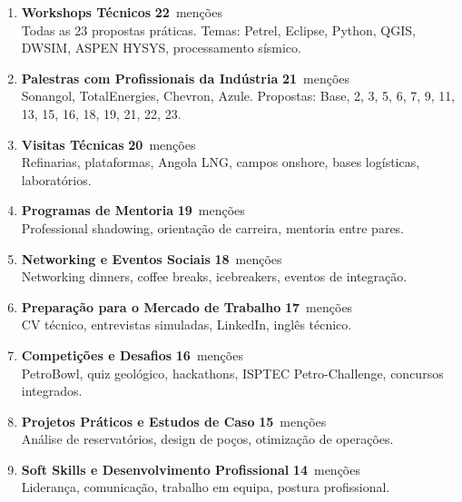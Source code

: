 \documentclass[12pt,a4paper]{article}
\newcommand{\freqstat}[2]{%
  {\large\bfseries\color{steelblue}#1}~{\small\color{muted}#2}%
}
\begin{document}
\begin{enumerate}[label={\color{steelblue}\bfseries\arabic*.}, itemsep=0.28cm]

\item \textbf{Workshops Técnicos} \hfill \freqstat{22}{menções}\\
{\small\color{muted}Todas as 23 propostas práticas. Temas: Petrel, Eclipse, Python, QGIS, DWSIM, ASPEN HYSYS, processamento sísmico.}

\item \textbf{Palestras com Profissionais da Indústria} \hfill \freqstat{21}{menções}\\
{\small\color{muted}Sonangol, TotalEnergies, Chevron, Azule. Propostas: Base, 2, 3, 5, 6, 7, 9, 11, 13, 15, 16, 18, 19, 21, 22, 23.}

\item \textbf{Visitas Técnicas} \hfill \freqstat{20}{menções}\\
{\small\color{muted}Refinarias, plataformas, Angola LNG, campos onshore, bases logísticas, laboratórios.}

\item \textbf{Programas de Mentoria} \hfill \freqstat{19}{menções}\\
{\small\color{muted}Professional shadowing, orientação de carreira, mentoria entre pares.}

\item \textbf{Networking e Eventos Sociais} \hfill \freqstat{18}{menções}\\
{\small\color{muted}Networking dinners, coffee breaks, icebreakers, eventos de integração.}

\item \textbf{Preparação para o Mercado de Trabalho} \hfill \freqstat{17}{menções}\\
{\small\color{muted}CV técnico, entrevistas simuladas, LinkedIn, inglês técnico.}

\item \textbf{Competições e Desafios} \hfill \freqstat{16}{menções}\\
{\small\color{muted}PetroBowl, quiz geológico, hackathons, ISPTEC Petro-Challenge, concursos integrados.}

\item \textbf{Projetos Práticos e Estudos de Caso} \hfill \freqstat{15}{menções}\\
{\small\color{muted}Análise de reservatórios, design de poços, otimização de operações.}

\item \textbf{Soft Skills e Desenvolvimento Profissional} \hfill \freqstat{14}{menções}\\
{\small\color{muted}Liderança, comunicação, trabalho em equipa, postura profissional.}


\end{enumerate}
\end{document}
